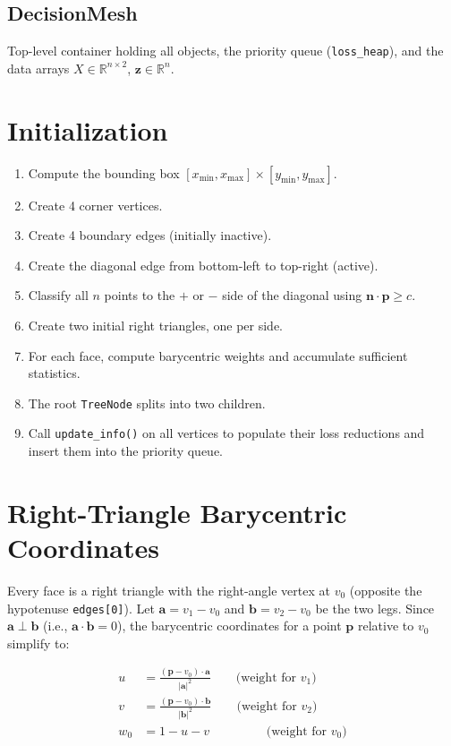 \documentclass{article}
\begin{document}
\subsection{DecisionMesh}
Top-level container holding all objects, the priority queue (\texttt{loss\_heap}), and the data arrays $X \in \mathbb{R}^{n \times 2}$, $\mathbf{z} \in \mathbb{R}^n$.

\section{Initialization}

\begin{enumerate}
    \item Compute the bounding box $[x_{\min}, x_{\max}] \times [y_{\min}, y_{\max}]$.
    \item Create 4 corner vertices.
    \item Create 4 boundary edges (initially inactive).
    \item Create the diagonal edge from bottom-left to top-right (active).
    \item Classify all $n$ points to the $+$ or $-$ side of the diagonal using $\mathbf{n} \cdot \mathbf{p} \geq c$.
    \item Create two initial right triangles, one per side.
    \item For each face, compute barycentric weights and accumulate sufficient statistics.
    \item The root \texttt{TreeNode} splits into two children.
    \item Call \texttt{update\_info()} on all vertices to populate their loss reductions and insert them into the priority queue.
\end{enumerate}

\section{Right-Triangle Barycentric Coordinates}

Every face is a right triangle with the right-angle vertex at $v_0$ (opposite the hypotenuse \texttt{edges[0]}). Let $\mathbf{a} = v_1 - v_0$ and $\mathbf{b} = v_2 - v_0$ be the two legs. Since $\mathbf{a} \perp \mathbf{b}$ (i.e., $\mathbf{a} \cdot \mathbf{b} = 0$), the barycentric coordinates for a point $\mathbf{p}$ relative to $v_0$ simplify to:

\begin{align}
    u &= \frac{(\mathbf{p} - v_0) \cdot \mathbf{a}}{|\mathbf{a}|^2} \qquad \text{(weight for } v_1\text{)} \\
    v &= \frac{(\mathbf{p} - v_0) \cdot \mathbf{b}}{|\mathbf{b}|^2} \qquad \text{(weight for } v_2\text{)} \\
    w_0 &= 1 - u - v \qquad\qquad\;\; \text{(weight for } v_0\text{)}
\end{align}
\end{document}
